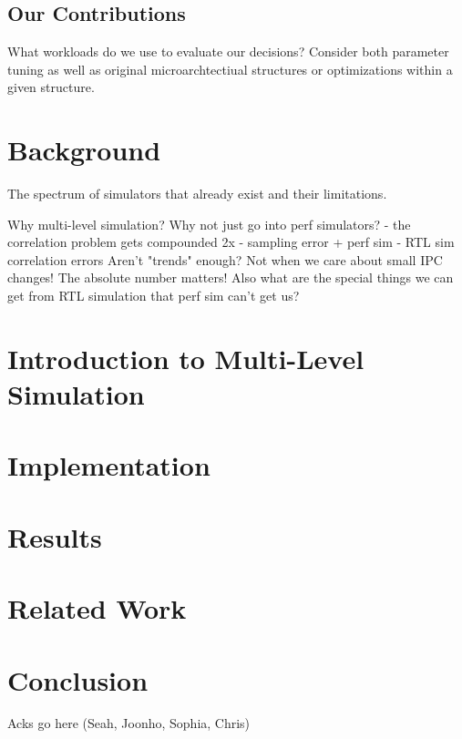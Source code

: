 \documentclass[sigplan,review,nonacm,10pt]{acmart}
\begin{document}
\subsection{Our Contributions}

What workloads do we use to evaluate our decisions?
Consider both parameter tuning as well as original microarchtectiual structures or optimizations within a given structure.



\section{Background}

The spectrum of simulators that already exist and their limitations.


Why multi-level simulation?
Why not just go into perf simulators? - the correlation problem gets compounded 2x - sampling error + perf sim - RTL sim correlation errors
Aren't "trends" enough? Not when we care about small IPC changes! The absolute number matters! Also what are the special things we can get from RTL simulation that perf sim can't get us?

\section{Introduction to Multi-Level Simulation}


\section{Implementation}

\section{Results}

\section{Related Work}

\section{Conclusion}

\begin{acks}
Acks go here (Seah, Joonho, Sophia, Chris)
\end{acks}




\end{document}
